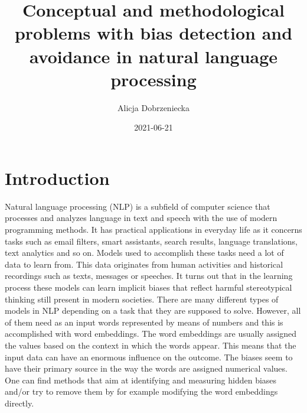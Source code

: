 \documentclass[12pt,]{book}
\title{Conceptual and methodological problems with bias detection and avoidance
in natural language processing}
\author{Alicja Dobrzeniecka}
\date{2021-06-21}
\begin{document}
\maketitle

{
\setcounter{tocdepth}{5}
\tableofcontents
}
\chapter{Introduction}\label{introduction}

Natural language processing (NLP) is a subfield of computer science that
processes and analyzes language in text and speech with the use of
modern programming methods. It has practical applications in everyday
life as it concerns tasks such as email filters, smart assistants,
search results, language translations, text analytics and so on. Models
used to accomplish these tasks need a lot of data to learn from. This
data originates from human activities and historical recordings such as
texts, messages or speeches. It turns out that in the learning process
these models can learn implicit biases that reflect harmful
stereotypical thinking still present in modern societies. There are many
different types of models in NLP depending on a task that they are
supposed to solve. However, all of them need as an input words
represented by means of numbers and this is accomplished with word
embeddings. The word embeddings are usually assigned the values based on
the context in which the words appear. This means that the input data
can have an enormous influence on the outcome. The biases seem to have
their primary source in the way the words are assigned numerical values.
One can find methods that aim at identifying and measuring hidden biases
and/or try to remove them by for example modifying the word embeddings
directly.
\end{document}
